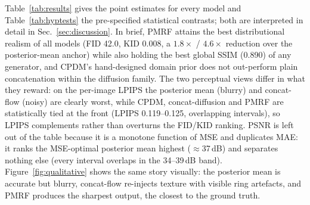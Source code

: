 \documentclass[11pt,a4paper]{article}
\newcommand{\num}[1]{#1}
\begin{document}
Table~\ref{tab:results} gives the point estimates for every model and Table~\ref{tab:hyptests}
the pre-specified statistical contrasts; both are interpreted in detail in
Sec.~\ref{sec:discussion}. In brief, PMRF attains the best distributional realism of all models
(FID \num{42.0}, KID \num{0.008}, a $1.8\times$ / $4.6\times$ reduction over the posterior-mean
anchor) while also holding the best global SSIM (\num{0.890}) of any generator, and CPDM's
hand-designed domain prior does not out-perform plain concatenation within the diffusion family.
The two perceptual
views differ in what they reward: on the per-image LPIPS the posterior mean (blurry) and
concat-flow (noisy) are clearly worst, while CPDM, concat-diffusion and PMRF are statistically
tied at the front (LPIPS \num{0.119}--\num{0.125}, overlapping intervals), so LPIPS complements
rather than overturns the FID/KID ranking. PSNR is left out of the table because it is a monotone
function of MSE and duplicates MAE: it ranks the MSE-optimal posterior mean highest
($\approx$\num{37}\,dB) and separates nothing else (every interval overlaps in the
\num{34}--\num{39}\,dB band).
Figure~\ref{fig:qualitative} shows the same story visually: the posterior mean is accurate but
blurry, concat-flow re-injects texture with visible ring artefacts, and PMRF produces the
sharpest output, the closest to the ground truth.
\end{document}
